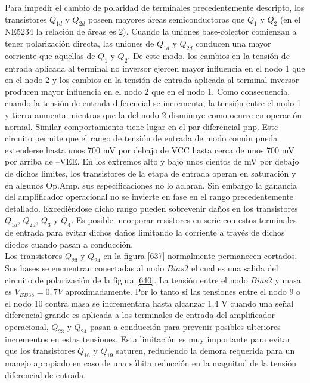 \documentclass[12pt,a4paper,final,headinclude,footinclude,BCOR5mm]{scrartcl}
\begin{document}
Para impedir el cambio de polaridad de terminales precedentemente descripto, los transistores $Q_{1d}$ y $Q_{2d}$ poseen mayores áreas semiconductoras que $Q_{1}$ y $Q_{2}$ (en el NE5234 la relación de áreas es 2). Cuando la uniones base-colector comienzan a tener polarización directa, las uniones de $Q_{1d}$ y $Q_{2d}$ conducen una mayor corriente que aquellas de $Q_{1}$ y $Q_{2}$. De este modo, los cambios en la tensión de entrada aplicada al terminal no inversor ejercen mayor influencia en el nodo 1 que en el nodo 2 y los cambios en la tensión de entrada aplicada al terminal inversor producen mayor influencia en el nodo 2 que en el nodo 1. Como consecuencia, cuando la tensión de entrada diferencial se incrementa, la tensión entre el nodo 1 y tierra aumenta mientras que la del nodo 2 disminuye como ocurre en operación normal. Similar comportamiento tiene lugar en el par diferencial pnp. Este circuito permite que el rango de tensión de entrada de modo común pueda extenderse hasta unos 700 mV por debajo de VCC hasta cerca de unos 700 mV por arriba de –VEE. En los extremos alto y bajo unos cientos de mV por debajo de dichos limites, los transistores de la etapa de entrada operan en saturación y en algunos Op.Amp. sus especificaciones no lo aclaran. Sin embargo la ganancia del amplificador operacional no se invierte en fase en el rango precedentemente detallado. Excediéndose dicho rango pueden sobrevenir daños en los transistores $Q_{1d}$, $Q_{2d}$, $Q_{3}$ y $Q_{4}$. Es posible incorporar resistores en serie con estos terminales de entrada para evitar dichos daños limitando la corriente a través de dichos diodos cuando pasan a conducción.\\

Los transistores $Q_{23}$ y $Q_{24}$ en la figura \ref{637} normalmente permanecen cortados. Sus bases se encuentran conectadas al nodo $Bias2$ el cual es una salida del circuito de polarización de la figura \ref{640}. La tensión entre el nodo $Bias2$ y masa es $V_{EB38} = 0,7 V$ aproximadamente. Por lo tanto si las tensiones entre el nodo 9 o el nodo 10 contra masa se incrementara hasta alcanzar 1,4 V cuando una señal diferencial grande es aplicada a los terminales de entrada del amplificador operacional, $Q_{23}$ y $Q_{24}$ pasan a conducción para prevenir posibles ulteriores incrementos en estas tensiones. Esta limitación es muy importante para evitar que los transistores $Q_{16}$ y $Q_{19}$ saturen, reduciendo la demora requerida para un manejo apropiado en caso de una súbita reducción en la magnitud de la tensión diferencial de entrada.\\
\end{document}
